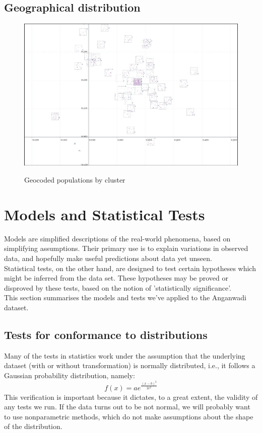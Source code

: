 \documentclass[10pt]{article}
\begin{document}
\subsection{Geographical distribution}
\begin{figure}
\caption{Geocoded populations by cluster}
\label{GeographicalDistributionOfPopulation}
\begin{center}
\includegraphics[width=170mm]{ReportMedia/GeographicalDistributionOfPopulation.jpg}\\
\end{center}
\end{figure}
\section{Models and Statistical Tests}
Models are simplified descriptions of the real-world phenomena, based on simplifying assumptions. Their primary use is to explain variations in observed data, and hopefully make useful predictions about data yet unseen.\\
Statistical tests, on the other hand, are designed to test certain hypotheses which might be inferred from the data set. These hypotheses may be proved or disproved by these tests, based on the notion of 'statistically significance'.\\ 
This section summarises the models and tests we've applied to the Anganwadi dataset.
\subsection{Tests for conformance to distributions}
Many of the tests in statistics work under the assumption that the underlying dataset (with or without transformation) is normally distributed, i.e., it follows a Gaussian probability distribution, namely:\\
\[f(x) = a e^ {\frac{(x-b)^2}{2c^2}}\]
This verification is important because it dictates, to a great extent, the validity of any tests we run. If the data turns out to be not normal, we will probably want to use nonparametric methods, which do not make assumptions about the shape of the distribution.
\end{document}
